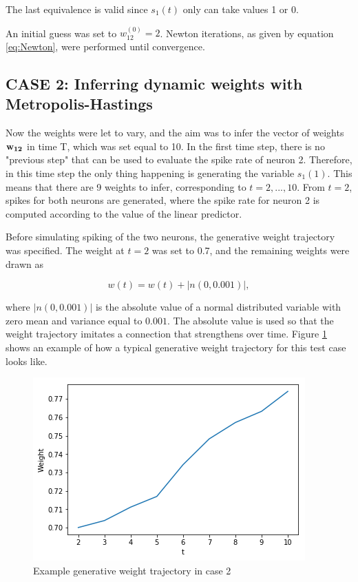 The last equivalence is valid since $s_{1}(t)$ only can take values 1 or 0. 

An initial guess was set to $w_{12}^{(0)} = 2$. Newton iterations, as given by equation \ref{eq:Newton}, were performed until convergence.\\ 

\subsection{CASE 2: Inferring dynamic weights with Metropolis-Hastings}
\label{sec:CASE2}
Now the weights were let to vary, and the aim was to infer the vector of weights ${\bf w_{12}}$ in time T, which was set equal to 10. In the first time step, there is no "previous step" that can be used to evaluate the spike rate of neuron 2. Therefore, in this time step the only thing happening is generating the variable $s_{1}(1)$. This means that there are 9 weights to infer, corresponding to $t=2,...,10$. From $t=2$, spikes for both neurons are generated, where the spike rate for neuron 2 is computed according to the value of the linear predictor. 

Before simulating spiking of the two neurons, the generative weight trajectory was specified. The weight at $t=2$ was set to 0.7, and the remaining weights were drawn as

\begin{equation}
    w(t) = w(t) + |n(0,0.001)|,
\end{equation}

where $|n(0,0.001)|$ is the absolute value of a normal distributed variable with zero mean and variance equal to $0.001$. The absolute value is used so that the weight trajectory imitates a connection that strengthens over time. Figure \ref{fig:Generative} shows an example of how a typical generative weight trajectory for this test case looks like. 

\begin{figure}
\caption{Example generative weight trajectory in case 2}
\label{fig:Generative}
    \centering
    \includegraphics[scale=0.8]{fig/UL.png}
\end{figure}


